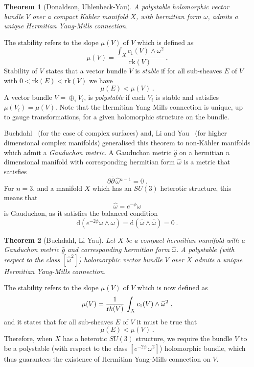 \documentclass[12pt,a4paper]{article}
\def\bar#1{\overline{#1}}
\def\d{\textrm{d}}
\newtheorem{Theorem}{Theorem}
\theoremstyle{definition}
\begin{document}
\begin{Theorem}[Donaldson, Uhlenbeck-Yau]
A polystable holomorphic vector bundle $V$ over a compact K\"ahler manifold $X$, with hermitian form $\omega$, admits a unique Hermitian Yang-Mills connection.
\end{Theorem}
\rightline{$\square$}
\noindent The stability refers to the slope $\mu(V)$ of $V$ which is defined as
$$\mu(V) = \frac{\int_X c_1(V)\wedge\omega^2}{\text{rk}(V)}~.$$
Stability of $V$ states that a vector bundle $V$ is {\it stable} if for all sub-sheaves  $E$ of $V$ with $0<\text{rk}(E)<\text{rk}(V)$ we have
$$\mu(E)<\mu(V)~.$$
A vector bundle $V = \oplus_i V_i$, is {\it polystable} if each $V_i$ is stable and satisfies $\mu(V_i)=\mu(V).$ 
Note that the Hermitian Yang Mills connection is unique, up to gauge transformations, for a given holomorphic structure on the bundle.

Buchdahl~\citep{MR939923} (for the case of complex surfaces) and,  Li and Yau~\citep{MR915839} (for higher dimensional complex manifolds) generalised this theorem to non-K\"ahler manifolds which admit a {\it Gauduchon metric}.  A Gauduchon metric $\hat g$ on a hermitian $n$ dimensional manifold with corresponding hermitian form $\widehat\omega$ is a metric that satisfies
$$\partial\bar\partial\,\widehat\omega{}^{n-1} = 0~.$$
For $n=3$, and a manifold $X$ which has an $SU(3)$ heterotic structure, this means that 
$$\widehat\omega = e^{-\phi}\omega$$ 
is Gauduchon, as it satisfies the balanced condition
$$\d( e^{-2\phi}\omega\wedge\omega)= \d(\widehat\omega\wedge\widehat\omega)=0~.$$
\vskip5pt

\begin{Theorem}[Buchdahl, Li-Yau]
Let $X$ be a compact hermitian manifold with a Gauduchon metric $\hat g$ and corresponding hermitian form $\widehat\omega$.  A polystable (with respect to the class $[\widehat\omega^2]$) holomorphic vector bundle $V$ over $X$ admits a unique Hermitian Yang-Mills connection.
\end{Theorem}
\rightline{$\square$}
\noindent The stability refers to the slope $\mu(V)$ of $V$ which is now defined as
\[\mu(V) = \frac{1}{{\text rk}(V)}\, \int_X c_1(V)\wedge\widehat\omega^2~,\]
and it states that for all sub-sheaves $E$ of $V$ it must be true that
\[ \mu(E)<\mu(V)~.\]
Therefore, when $X$ has a heterotic $SU(3)$ structure, we require the bundle $V$ to be a polystable (with respect to the class $[e^{-2\phi}\,\omega^2]$) holomorphic bundle, which thus guarantees the existence of Hermitian Yang-Mills connection on $V$.
\end{document}
